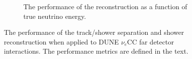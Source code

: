\begin{figure}
\begin{subfigure}[t]{0.48\linewidth}
    \caption{The performance of the reconstruction as a function of true neutrino energy.}
    \label{fig:GoodReconstructionEnergy}
  \end{subfigure}
  \caption[The performance of the track/shower separation and shower reconstruction when applied to DUNE $\nu_e$CC far detector interactions.]{The performance of the track/shower separation and shower reconstruction when applied to DUNE $\nu_e$CC far detector interactions.  The performance metrics are defined in the text.}
  \label{fig:GoodReconstruction}
\end{figure}
